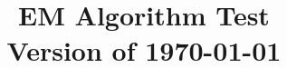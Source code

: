 \documentclass{amsart}
\begin{document}
\title[EM Test]
{EM Algorithm Test\\
Version of \today }
\maketitle







\end{document}
